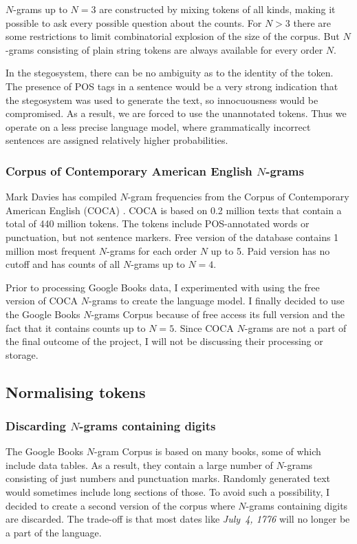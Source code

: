 \documentclass[draft]{IIBproject}
\begin{document}
$N$-grams up to $N=3$ are constructed by mixing tokens of all kinds, making it possible to ask every possible question about the counts. For $N > 3$ there are some restrictions to limit combinatorial explosion of the size of the corpus. But $N$-grams consisting of plain string tokens are always available for every order $N$.

In the stegosystem, there can be no ambiguity as to the identity of the token. The presence of POS tags in a sentence would be a very strong indication that the stegosystem was used to generate the text, so innocuousness would be compromised. As a result, we are forced to use the unannotated tokens. Thus we operate on a less precise language model, where grammatically incorrect sentences are assigned relatively higher probabilities.

\subsubsection{Corpus of Contemporary American English $N$-grams}
\label{sec:coca}

Mark Davies has compiled $N$-gram frequencies \cite{web:byu_ngrams} from the Corpus of Contemporary American English (COCA) \cite{coca2010}. COCA is based on 0.2 million texts that contain a total of 440 million tokens. The tokens include POS-annotated words or punctuation, but not sentence markers. Free version of the database contains 1 million most frequent $N$-grams for each order $N$ up to 5. Paid version has no cutoff and has counts of all $N$-grams up to $N=4$.

Prior to processing Google Books data, I experimented with using the free version of COCA $N$-grams to create the language model. I finally decided to use the Google Books $N$-grams Corpus because of free access its full version and the fact that it contains counts up to $N=5$. Since COCA $N$-grams are not a part of the final outcome of the project, I will not be discussing their processing or storage.

\FloatBarrier
\subsection{Normalising tokens}

\subsubsection{Discarding $N$-grams containing digits}

The Google Books $N$-gram Corpus is based on many books, some of which include data tables. As a result, they contain a large number of $N$-grams consisting of just numbers and punctuation marks. Randomly generated text would sometimes include long sections of those. To avoid such a possibility, I decided to create a second version of the corpus where $N$-grams containing digits are discarded. The trade-off is that most dates like \emph{July~4, 1776} will no longer be a part of the language.
\end{document}
